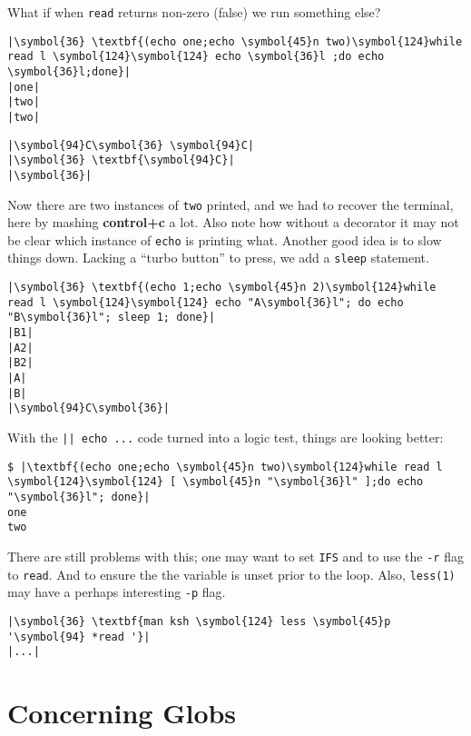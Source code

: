 \documentclass[10pt,a4paper]{article}
\begin{document}
What if when \texttt{read} returns non-zero (false) we run something else?

\begin{lstlisting}
|\symbol{36} \textbf{(echo one;echo \symbol{45}n two)\symbol{124}while read l \symbol{124}\symbol{124} echo \symbol{36}l ;do echo \symbol{36}l;done}|
|one|
|two|
|two|
\end{lstlisting}
\clearpage

\begin{lstlisting}
|\symbol{94}C\symbol{36} \symbol{94}C|
|\symbol{36} \textbf{\symbol{94}C}|
|\symbol{36}|
\end{lstlisting}

Now there are two instances of \texttt{two} printed, and we had to
recover the terminal, here by mashing \textbf{control+c} a lot. Also
note how without a decorator it may not be clear which instance of
\texttt{echo} is printing what. Another good idea is to slow things
down. Lacking a ``turbo button'' to press, we add a \texttt{sleep}
statement.

\begin{lstlisting}
|\symbol{36} \textbf{(echo 1;echo \symbol{45}n 2)\symbol{124}while read l \symbol{124}\symbol{124} echo "A\symbol{36}l"; do echo "B\symbol{36}l"; sleep 1; done}|
|B1|
|A2|
|B2|
|A|
|B|
|\symbol{94}C\symbol{36}|
\end{lstlisting}

With the \texttt{|| echo ...} code turned into a logic test, things are
looking better:

\begin{lstlisting}
$ |\textbf{(echo one;echo \symbol{45}n two)\symbol{124}while read l \symbol{124}\symbol{124} [ \symbol{45}n "\symbol{36}l" ];do echo "\symbol{36}l"; done}|
one
two
\end{lstlisting}

There are still problems with this; one may want to set \texttt{IFS} and
to use the \texttt{-r} flag to \texttt{read}. And to ensure the the
variable is unset prior to the loop. Also, \texttt{less(1)} may have a
perhaps interesting \texttt{-p} flag.

\begin{lstlisting}
|\symbol{36} \textbf{man ksh \symbol{124} less \symbol{45}p '\symbol{94} *read '}|
|...|
\end{lstlisting}

\section*{Concerning Globs}
\end{document}

